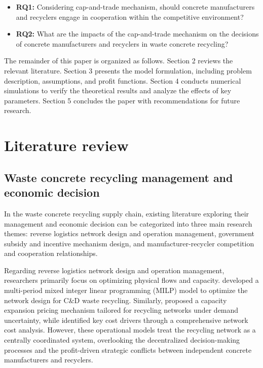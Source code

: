 \documentclass[authoryear,preprint,review,times,10pt]{elsarticle}
\begin{document}
\begin{itemize}
\item \textbf{RQ1:} Considering cap-and-trade mechanism, should concrete manufacturers and recyclers engage in cooperation within the competitive environment?
\item \textbf{RQ2:} What are the impacts of the cap-and-trade mechanism on the decisions of concrete manufacturers and recyclers in waste concrete recycling?
\end{itemize}

The remainder of this paper is organized as follows. Section 2 reviews the relevant literature. Section 3 presents the model formulation, including problem description, assumptions, and profit functions. Section 4 conducts numerical simulations to verify the theoretical results and analyze the effects of key parameters. Section 5 concludes the paper with recommendations for future research.

\section{Literature review}
\subsection{Waste concrete recycling management and economic decision}
In the waste concrete recycling supply chain, existing literature exploring their management and economic decision can be categorized into three main research themes: reverse logistics network design and operation management, government subsidy and incentive mechanism design, and manufacturer-recycler competition and cooperation relationships.

Regarding reverse logistics network design and operation management, researchers primarily focus on optimizing physical flows and capacity. \cite{rahimi2018Sustainable} developed a multi-period mixed integer linear programming (MILP) model to optimize the network design for C\&D waste recycling. Similarly, \cite{xu2019Reverse} proposed a capacity expansion pricing mechanism tailored for recycling networks under demand uncertainty, while \cite{liu2019Expand} identified key cost drivers through a comprehensive network cost analysis. However, these operational models treat the recycling network as a centrally coordinated system, overlooking the decentralized decision-making processes and the profit-driven strategic conflicts between independent concrete manufacturers and recyclers.
\end{document}
